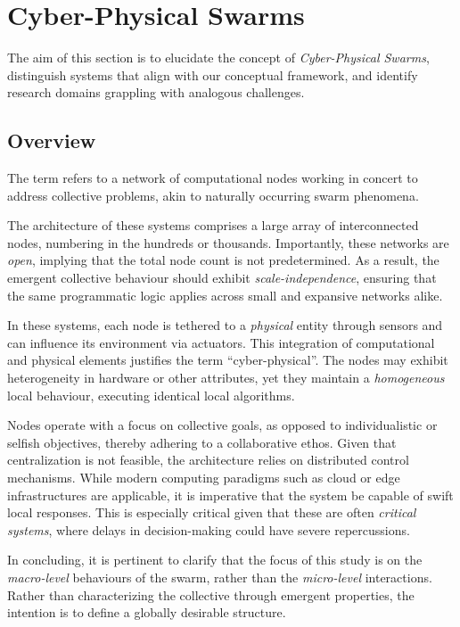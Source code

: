 \chapter{Cyber-Physical Swarms}\label{chap:cpsw}
\minitoc%
The aim of this section is to elucidate the concept of \textit{Cyber-Physical Swarms}, 
 distinguish systems that align with our conceptual framework, 
 and identify research domains grappling with analogous challenges. 
% 
\section{Overview}
The term refers to a network of computational nodes working in concert to address collective problems, 
 akin to naturally occurring swarm phenomena.

The architecture of these systems comprises a large array of interconnected nodes, 
 numbering in the hundreds or thousands. 
% 
Importantly, these networks are \textit{open}, 
 implying that the total node count is not predetermined. 
% 
As a result, 
 the emergent collective behaviour should exhibit \textit{scale-independence}, 
 ensuring that the same programmatic logic applies across small and expansive networks alike.

In these systems, each node is tethered to a \textit{physical} entity through sensors and can influence its environment via actuators. 
 This integration of computational and physical elements justifies the term ``cyber-physical''. 
 The nodes may exhibit heterogeneity in hardware or other attributes, 
 yet they maintain a \emph{homogeneous} local behaviour, executing identical local algorithms.

Nodes operate with a focus on collective goals, 
 as opposed to individualistic or selfish objectives, 
 thereby adhering to a collaborative ethos. 
% 
Given that centralization is not feasible, 
 the architecture relies on distributed control mechanisms. 
 While modern computing paradigms such as cloud or edge infrastructures are applicable, 
 it is imperative that the system be capable of swift local responses. 
 This is especially critical given that these are often \emph{critical systems}, 
 where delays in decision-making could have severe repercussions.

In concluding, 
 it is pertinent to clarify that the focus of this study is on the \textit{macro-level} behaviours of the swarm, 
 rather than the \textit{micro-level} interactions. 
 Rather than characterizing the collective through emergent properties, 
 the intention is to define a globally desirable structure.

